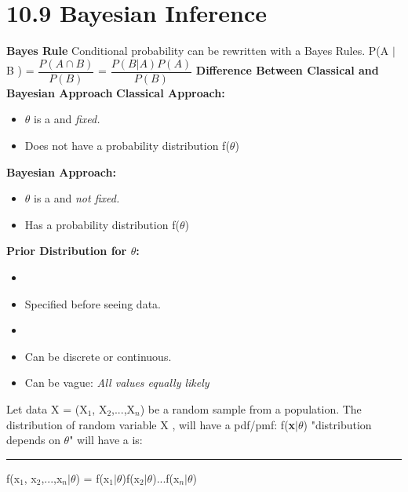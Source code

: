 \documentclass[]{article}
\begin{document}
\section{10.9 Bayesian Inference}
\Large\textbf{Bayes Rule} \newline
Conditional probability can be rewritten with a Bayes Rules.
\newline
\newline
P(A $|$ B ) = $\dfrac{P(A \cap B)}{ P(B) }$ = $\dfrac{P( B  |  A) P(A)}{ P(B) }$ 
\newline
\newline
\Large\textbf{Difference Between Classical and Bayesian Approach}
\newline
\textbf{Classical Approach:}
\begin{itemize}
	\item $\theta$ is a  and \textit{fixed.}
	\item Does not have a probability distribution f($\theta$)
\end{itemize}
\textbf{Bayesian Approach:}
\begin{itemize}
	\item $\theta$ is a  and \textit{not fixed.}
	\item Has a probability distribution f($\theta$)
\end{itemize}
\textbf{Prior Distribution for $\theta$:}
\begin{itemize}
	\item {}
	\item Specified before seeing data.
	\item {}
	\item Can be discrete or continuous.
	\item Can be vague: \textit{All values equally likely}
\end{itemize}
Let data X = (X$_1$, X$_2$,...,X$_n$) be a random sample from a population. \newline
The distribution of random variable X , will have a pdf/pmf: f(\textbf{x}$|$$\theta$)  "distribution depends on $\theta$" will have a   is:
\newline
\newline\Large\rule{5cm}{0pt} f(x$_1$, x$_2$,...,x$_n | \theta$) =  f(x$_1 | \theta$)f(x$_2 | \theta$)...f(x$_n | \theta$)
\end{document}

